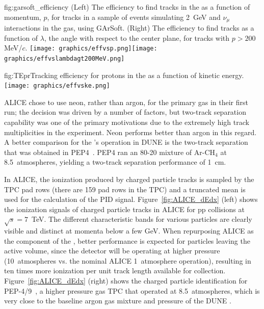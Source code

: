\begin{dunefigure}{fig:garsoft_efficiency}
{(Left) The efficiency to find tracks in the  as a function of momentum, $p$, for tracks in a sample of  events simulating \SI{2}{GeV} and $\nu_\mu$ interactions in the gas, using GArSoft. (Right) The efficiency to find tracks as a function of $\lambda$, the angle with respect to the center plane, for tracks with $p>200\,$MeV/$c$.}
    \texttt{[image: graphics/effvsp.png]}\texttt{[image: graphics/effvslambdagt200MeV.png]}
\end{dunefigure}

\begin{dunefigure}{fig:TEpr}{Tracking efficiency for protons in the  as a function of kinetic energy.} 
\texttt{[image: graphics/effvske.png]} 
\end{dunefigure}

ALICE chose to use neon, rather than argon, for the primary gas in their first run; the decision was driven by a number of factors, but two-track separation capability was one of the primary motivations due to the extremely high track multiplicities in the experiment.  Neon performs better than argon in this regard.  A better comparison for the 's operation in DUNE is the two-track separation that was obtained in PEP4~\cite{PEP4_Stork}.  PEP4 ran an 80-20 mixture of Ar-CH$_4$ at 8.5~atmospheres, yielding a two-track separation performance of \SI{1}{cm}.

In ALICE, the ionization produced by charged particle tracks is sampled by the TPC pad rows (there are 159 pad rows in the TPC) and a truncated mean is used for the calculation of the PID signal. Figure~\ref{fig:ALICE_dEdx} (left) shows the ionization signals of charged particle tracks in ALICE for pp collisions at $\sqrt{s} = 7$~TeV. The different characteristic bands for various particles are clearly visible and distinct at momenta below a few GeV.  When repurposing ALICE as the  component of the ,  better performance is expected for particles leaving the active volume, since the detector will be operating at higher pressure (10~atmospheres vs. the nominal ALICE 1~atmosphere operation), resulting in ten times more ionization per unit track length available for collection. Figure~\ref{fig:ALICE_dEdx} (right) shows the charged particle identification for PEP-4/9~\cite{Grupen:1999by}, a higher pressure gas TPC that operated at 8.5~atmospheres, which is very close to the baseline argon gas mixture and pressure of the DUNE .

